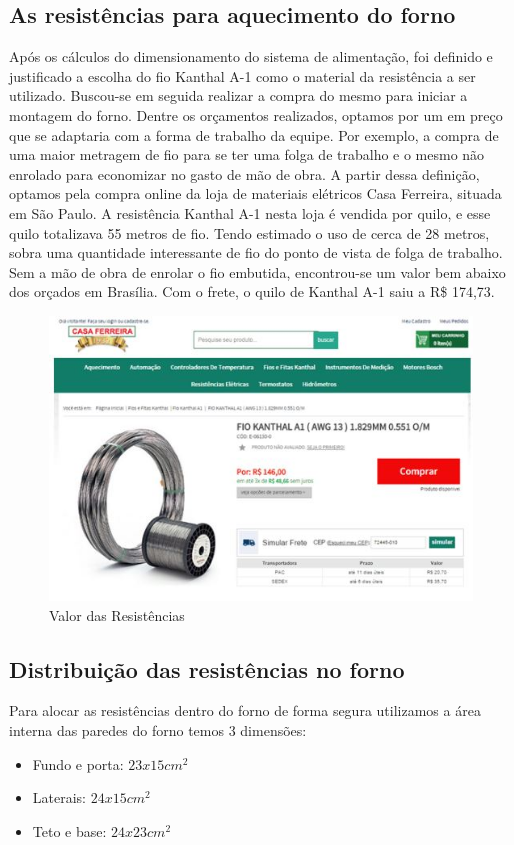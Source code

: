 \subsection{As resistências para aquecimento do forno}
Após os cálculos do dimensionamento do sistema de alimentação, foi definido e justificado a escolha do fio Kanthal A-1 como o material da resistência a ser utilizado.
Buscou-se em seguida realizar a compra do mesmo para iniciar a montagem do forno. Dentre os orçamentos realizados, optamos por um em preço que se adaptaria com a forma de trabalho da equipe. Por exemplo, a compra de uma maior metragem de fio para se ter uma folga de trabalho e o mesmo não enrolado para economizar no gasto de mão de obra.
A partir dessa definição, optamos pela compra online da loja de materiais elétricos Casa Ferreira, situada em São Paulo. A resistência Kanthal A-1 nesta loja é vendida por quilo, e esse quilo totalizava 55 metros de fio. Tendo estimado o uso de cerca de 28 metros, sobra uma quantidade interessante de fio do ponto de vista de folga de trabalho. Sem a mão de obra de enrolar o fio embutida, encontrou-se um valor bem abaixo dos orçados em Brasília. Com o frete, o quilo de Kanthal A-1 saiu a R\$ 174,73.
\begin{figure}[!h]
	\centering
	\label{resistencia1}
	\includegraphics[keepaspectratio=true,scale=1.0]{figuras/alimentacao1.JPG}
	\caption{Valor das Resistências}
\end{figure}

\subsection{Distribuição das resistências no forno}
Para alocar as resistências dentro do forno de forma segura utilizamos a área interna das paredes do forno temos 3 dimensões:
\begin{itemize}
	\item Fundo e porta: $23x15 cm^2$
	\item Laterais: $24x15cm^2$
	\item Teto e base: $24x23cm^2$
\end{itemize}

